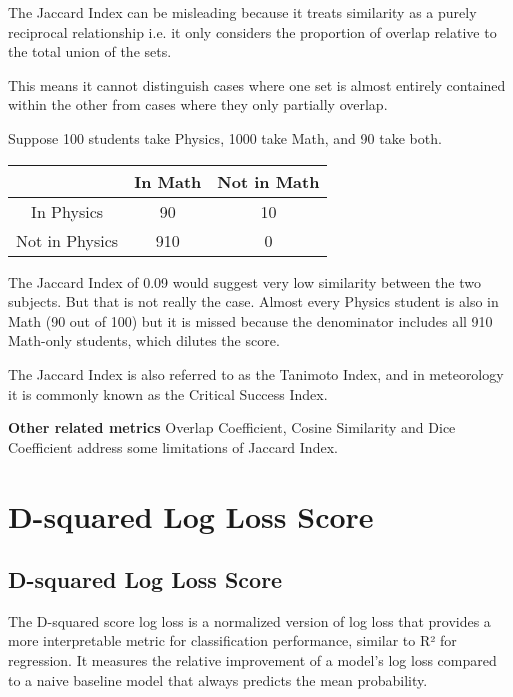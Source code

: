 The Jaccard Index can be misleading because it treats similarity as a purely reciprocal relationship i.e. it only considers the proportion of overlap relative to the total union of the sets. 

This means it cannot distinguish cases where one set is almost entirely contained within the other from cases where they only partially overlap. 

Suppose 100 students take Physics, 1000 take Math, and 90 take both. 

\begin{center}
    \begin{tabular}{|c|c|c|}
\hline
    & In Math & Not in Math \\
\hline
In Physics & \cellcolor[HTML]{edf7ec} 90 & 10 \\
\hline
Not in Physics & \cellcolor[HTML]{fbecec} 910 & 0 \\
\hline
\end{tabular}
\end{center}
The Jaccard Index of 0.09 would suggest very low similarity between the two subjects. 
But that is not really the case. Almost every Physics student is also in Math (90 out of 100) but it is missed because the denominator includes all 910 Math-only students, which dilutes the score. 


{The Jaccard Index is also referred to as the Tanimoto Index, and in meteorology it is commonly known as the Critical Success Index.}

\textbf{Other related metrics}
Overlap Coefficient, Cosine Similarity and Dice Coefficient address some limitations of Jaccard Index.

\clearpage
\thispagestyle{classificationstyle}
\section{D-squared Log Loss Score}
\subsection{D-squared Log Loss Score}

The D-squared score log loss is a normalized version of log loss that provides a more interpretable metric for classification performance, similar to R² for regression.
It measures the relative improvement of a model's log loss compared to a naive baseline model that always predicts the mean probability.

